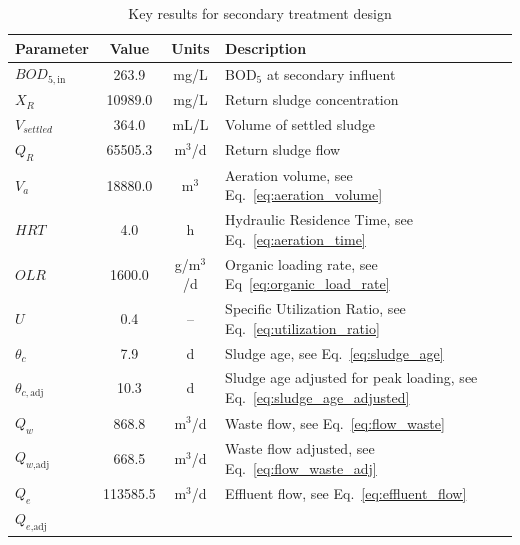 \documentclass[11pt]{article}
\begin{document}
\begin{table}[h]
\centering
\caption{Key results for secondary treatment design}
\label{tab:secondary_results}
\begin{tabularx}{\textwidth}{|l|c|c|X|}
\hline
\textbf{Parameter} & \textbf{Value} & \textbf{Units} & \textbf{Description} \\
\hline
$BOD_{5,\text{in}}$ & 
263.9
& mg/L & BOD$_5$ at secondary influent \\
$X_R$ & 
10989.0
& mg/L & Return sludge concentration \\
$V_{settled}$ & 
364.0
& mL/L & Volume of settled sludge \\
$Q_R$ & 
65505.3
& m$^3$/d & Return sludge flow \\
$V_a$ & 
18880.0
& m$^3$ & Aeration volume, see Eq.~\eqref{eq:aeration_volume} \\
$HRT$ & 
4.0
& h & Hydraulic Residence Time, see Eq.~\eqref{eq:aeration_time} \\
$OLR$ & 
1600.0
& g/m$^3$/d & Organic loading rate, see Eq~\eqref{eq:organic_load_rate}\\
$U$ &
0.4
& -- & Specific Utilization Ratio, see Eq.~\eqref{eq:utilization_ratio}\\
$\theta_c$ & 
7.9
& d & Sludge age, see Eq.~\eqref{eq:sludge_age}\\
$\theta_{c,\text{adj}}$ & 
10.3
& d & Sludge age adjusted for peak loading, see Eq.~\eqref{eq:sludge_age_adjusted} \\
$Q_w$ &
868.8
& m$^3$/d & Waste flow, see Eq.~\eqref{eq:flow_waste}\\
$Q_{w\text{,adj}}$ &
668.5
& m$^3$/d & Waste flow adjusted, see Eq.~\eqref{eq:flow_waste_adj}\\
$Q_e$ &
113585.5
& m$^3$/d & Effluent flow, see Eq.~\eqref{eq:effluent_flow}\\
$Q_{e\text{,adj}}$ &

\end{tabularx}
\end{table}
\end{document}
